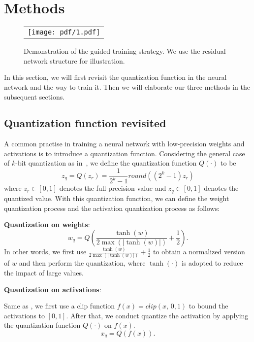 \documentclass[10pt,twocolumn,letterpaper]{article}
\begin{document}
\section{Methods}
\begin{figure*}[!t]
	\centering
	\resizebox{0.9\linewidth}{!}
	{
		\begin{tabular}{c}
			\texttt{[image: pdf/1.pdf]}
		\end{tabular}
	}
	\caption{Demonstration of the guided training strategy. We use the residual network structure for illustration.}
	\label{fig:knowledge_transfer}
\end{figure*}
In this section, we will first revisit the quantization function in the neural network and the way to train it. Then we will elaborate our three methods in the subsequent sections.
\subsection{Quantization function revisited} \label{sec:baseline}
%

A common practise in training a neural network with low-precision weights and activations is to introduce a quantization function. Considering the general case of $k$-bit quantization as in~\cite{zhou2016dorefa}, we define the quantization function $Q(\cdot)$ to be
\begin{equation}
	{z_q} = Q({z_r}) = \frac{1}{{{2^k} - 1}}round(({2^k} - 1){z_r})
\end{equation}
where ${z_r} \in [0,1]$ denotes the full-precision value and ${z_q} \in [0,1]$ denotes the quantized value. With this quantization function, we can define the weight quantization process and the activation quantization process as follows:


\noindent \textbf{Quantization on weights}:
\begin{equation}\label{eq:quan-weigtht}
	{w_q} = Q(\frac{{\tanh (w)}}{{2\max (\left| {\tanh (w)} \right|)}} + \frac{1}{2}).
\end{equation}In other words, we first use $\frac{{\tanh (w)}}{{2\max (\left| {\tanh (w)} \right|)}} + \frac{1}{2}$ to obtain a normalized version of $w$ and then perform the quantization, where $\tanh(\cdot)$ is adopted to reduce the impact of large values.

\noindent \textbf{Quantization on activations}:

 Same as \cite{zhou2016dorefa}, we first use a clip function $f(x) = clip(x,\,0,1)$ to bound the activations to $[0, 1]$. After that, we conduct quantize the activation by applying the quantization function $Q(\cdot)$ on $f(x)$.
\begin{equation} \label{eq:quan-activations}
	{x_q} = Q(f(x)).
\end{equation}
\end{document}
